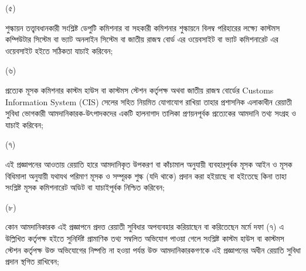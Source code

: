 \documentclass[12pt]{article}
\begin{document}
\begin{minipage}[t]{0.05\linewidth}
(৫)
\end{minipage}
\begin{minipage}[t]{0.9\linewidth}
শুল্কায়ন তত্ত্বাবধানকারী সংশ্লিষ্ট ডেপুটি কমিশনার বা
সহকারী কমিশনার শুল্কায়নে বিলম্ব পরিহারের লক্ষ্যে
কাস্টমস কম্পিউটার সিস্টেম বা ভ্যাট
অনলাইন সিস্টেম বা জাতীয় রাজস্ব বোর্ড এর
ওয়েবসাইট বা ভ্যাট কমিশনারেট এর ওয়েবসাইট
হইতে সঠিকতা যাচাই করিবেন;
\\
\end{minipage}
\begin{minipage}[t]{0.05\linewidth}
\hspace{1em}
\end{minipage}
\begin{minipage}[t]{0.05\linewidth}
(৬)
\end{minipage}
\begin{minipage}[t]{0.9\linewidth}
প্রত্যেক মূসক কমিশনার কাস্টম হাউস বা
কাস্টমস স্টেশন কর্তৃপক্ষ অথবা জাতীয় রাজস্ব বোর্ডের
Customs Information System (CIS)
সেলের সহিত নিয়মিত যোগাযোগ রাখিয়া তাহার
প্রশাসনিক এলাকাধীন রেয়াতী সুবিধা ভোগকারী
আমদানিকারক-উৎপাদকদের একটি হালনাগাদ তালিকা
প্রণয়নপূর্বক প্রত্যেকের আমদানি তথ্য সংগ্রহ ও যাচাই
করিবেন;
\end{minipage}
\begin{minipage}[t]{0.05\linewidth}
\hspace{1em}
\end{minipage}
\begin{minipage}[t]{0.05\linewidth}
(৭)
\end{minipage}
\begin{minipage}[t]{0.9\linewidth}
এই প্রজ্ঞাপনের আওতায় রেয়াতি হারে আমদানিকৃত
উপকরণ বা কাঁচামাল অনুযায়ী ব্যবহারপূর্বক মূসক
আইন ও মূসক বিধিমালা অনুযায়ী
যথাযথ পরিমাণ মূসক ও সম্পূরক শুল্ক (যদি থাকে) প্রদান
করা হইয়াছে বা হইতেছে কিনা তাহা সংশ্লিষ্ট মূসক
কমিশনারেট অডিট বা যাচাইপূর্বক নিশ্চিত করিবেন;
\\
\end{minipage}
\begin{minipage}[t]{0.05\linewidth}
\hspace{1em}
\end{minipage}
\begin{minipage}[t]{0.05\linewidth}
(৮)
\end{minipage}
\begin{minipage}[t]{0.9\linewidth}
কোন আমদানিকারক এই প্রজ্ঞাপনে প্রদত্ত রেয়াতী
সুবিধার অপব্যবহার করিয়াছেন বা করিতেছেন
মর্মে দফা (৭) এ উল্লিখিত কর্তৃপক্ষ হইতে সুনির্দিষ্ট
প্রামাণিক তথ্য সম্বলিত অভিযোগ পাওয়া গেলে সংশ্লিষ্ট
কাস্টম হাউস বা কাস্টমস স্টেশন কর্তৃপক্ষ উক্ত অভিযোগের
নিষ্পত্তি না হওয়া পর্যন্ত উক্ত আমদানিকারকগণকে
এই প্রজ্ঞাপনের অধীন রেয়াতি সুবিধা প্রদান স্থগিত রাখিবেন;
\\
\end{minipage}
\end{document}
